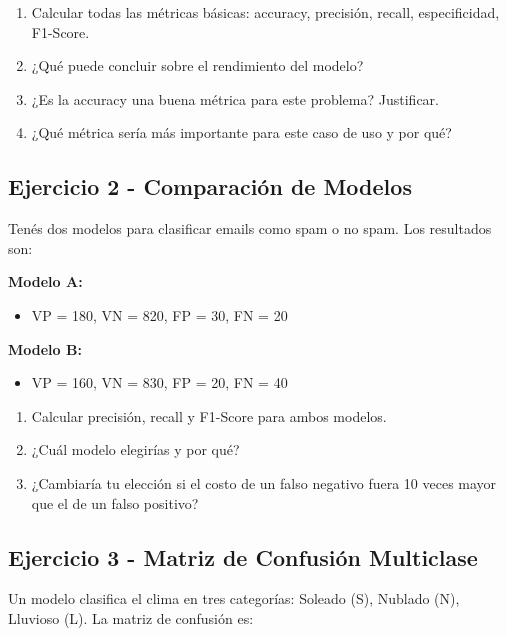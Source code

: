 \documentclass[12pt]{article}
\begin{document}
\begin{enumerate}
    \item[a.] Calcular todas las métricas básicas: accuracy, precisión, recall, especificidad, F1-Score.
    \item[b.] ¿Qué puede concluir sobre el rendimiento del modelo?
    \item[c.] ¿Es la accuracy una buena métrica para este problema? Justificar.
    \item[d.] ¿Qué métrica sería más importante para este caso de uso y por qué?
\end{enumerate}

\subsection{Ejercicio 2 - Comparación de Modelos}

Tenés dos modelos para clasificar emails como spam o no spam. Los resultados son:

\textbf{Modelo A:}
\begin{itemize}
    \item VP = 180, VN = 820, FP = 30, FN = 20
\end{itemize}

\textbf{Modelo B:}
\begin{itemize}
    \item VP = 160, VN = 830, FP = 20, FN = 40
\end{itemize}

\begin{enumerate}
    \item[a.] Calcular precisión, recall y F1-Score para ambos modelos.
    \item[b.] ¿Cuál modelo elegirías y por qué?
    \item[c.] ¿Cambiaría tu elección si el costo de un falso negativo fuera 10 veces mayor que el de un falso positivo?
\end{enumerate}

\subsection{Ejercicio 3 - Matriz de Confusión Multiclase}

Un modelo clasifica el clima en tres categorías: Soleado (S), Nublado (N), Lluvioso (L). La matriz de confusión es:
\end{document}
